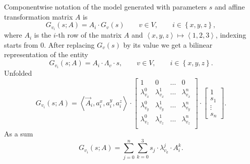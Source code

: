 Componentwise notation of the model
generated with parameters $s$ and affine transformation matrix $A$
is
\begin{equation*}
  G_{v_i}\left( s; A \right)
  = A_i \cdot G_v\left( s \right)
  \qquad v \in V,
  \qquad i \in \left\{ x, y, z \right\},
\end{equation*}
where $A_i$ is the $i$-th row of the matrix $A$ and
$\left\langle x, y, z \right\rangle \mapsto \left\langle 1, 2, 3 \right\rangle$,
indexing starts from $0$.
After replacing $G_v\left( s \right)$ by its value we get
a bilinear representation of the entity
\begin{equation*}
  G_{v_i}\left( s; A \right)
  = A_i \cdot \Lambda_v \cdot s,
  \qquad v \in V,
  \qquad i \in \left\{ x, y, z \right\}.
\end{equation*}
Unfolded
\begin{equation*}
  G_{v_i}\left( s; A \right)
  = \left\langle \vec{A}_i, a_i^x, a_i^y, a_i^z \right\rangle
    \cdot \begin{bmatrix}
      1               & 0               & \dots & 0 \\
      \lambda^0_{v_x} & \lambda^1_{v_x} & \dots & \lambda^n_{v_x} \\
      \lambda^0_{v_y} & \lambda^1_{v_y} & \dots & \lambda^n_{v_y} \\
      \lambda^0_{v_z} & \lambda^1_{v_z} & \dots & \lambda^n_{v_z} \\
    \end{bmatrix}
    \cdot \begin{bmatrix}
      1 \\
      s_1 \\
      \vdots \\
      s_n
    \end{bmatrix}.
\end{equation*}
As a sum
\begin{equation*}
  G_{v_i}\left( s; A \right)
  = \sum\limits_{j = 0}^{n} \sum\limits_{k = 0}^{3}
    s_{j} \cdot \lambda^{j}_{v_k} \cdot A_i^{k}.
\end{equation*}
